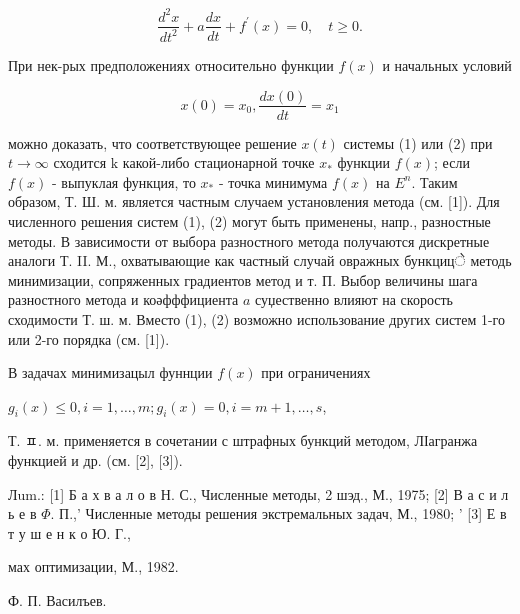 \documentclass[10pt]{article}
\begin{document}
\[

\frac{d^{2} x}{d t^{2}}+a \frac{d x}{d t}+f^{\prime}(x)=0, \quad t \geqslant 0 .

\]



При нек-рых предположениях относительно функции $f(x)$ и начальных условий



\[

x(0)=x_{0}, \frac{d x(0)}{d t}=x_{1}

\]



можно доказать, что соответствующее решение $x(t)$ системы (1) или (2) при $t \rightarrow \infty$ сходится $\mathrm{k}$ какой-либо стационарной точке $x_{*}$ функции $f(x)$; если $f(x)$ - выпуклая функция, то $x_{*}$ - точка минимума $f(x)$ на $E^{n}$. Таким образом, Т. Ш. м. является частным случаем установления метода (см. [1]). Для численного решения систем (1), (2) могут быть применены, напр., разностные методы. В зависимости от выбора разностного метода получаются дискретные аналоги Т. II. М., охватывающие как частный случай овражных бункцицे методь минимизации, сопряженных градиентов метод и т. П. Выбор величины шага разностного метода и коәфффициента $a$ суџественно влияют на скорость сходимости Т. ш. м. Вместо (1), (2) возможно использование других систем 1-го или 2-го порядка (см. [1]).



В задачах минимизацыл фуннции $f(x)$ при ограничениях



$g_{i}(x) \leqslant 0, i=1, \ldots, m ; g_{i}(x)=0, i=m+1, \ldots, s$,



Т. ㅍ. м. применяется в сочетании с штрафных бункций методом, ЛІагранжа функцией и др. (см. [2], [3]).



Лum.: [1] Б а х в а л о в Н. С., Численные методы, 2 шэд., М., 1975; [2] В а с и л ь е в $\Phi$. П.,' Численные методы решения экстремальных задач, М., 1980; ' [3] Е в т у ш е н к о Ю. Г.,



мах оптимизации, М., 1982.

Ф. П. Василъев.
\end{document}
